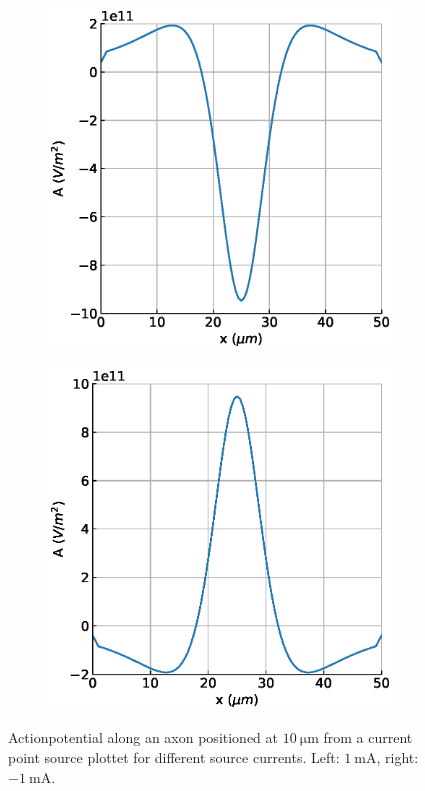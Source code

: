 \documentclass{scrartcl}			%
\begin{document}
\begin{figure}[H] 
  \begin{subfigure}[b]{0.5\linewidth}
    \centering
    \includegraphics[width=\linewidth]{imgs/activation_0.eps} 
    \label{fig:ext0} 
  \end{subfigure}%
  \quad
  \begin{subfigure}[b]{0.5\linewidth}
    \centering
    \includegraphics[width=\linewidth]{imgs/activation_1.eps} 
    \label{fig:ext1} 
    \end{subfigure} 
  \caption{Actionpotential along an axon positioned at $\SI{10}{\micro\meter}$ from a current point source  plottet for different source currents. Left: $\SI{1}{\milli\ampere}$, right: $\SI{-1}{\milli\ampere}$.}
  \label{fig:istim} 
\end{figure}
\end{document}

